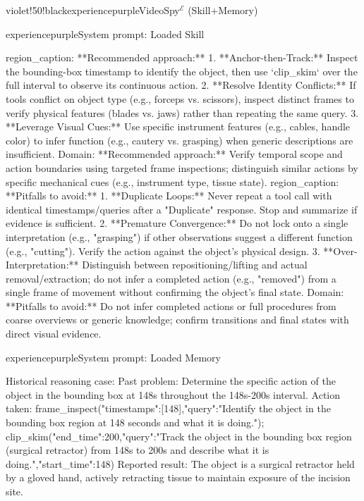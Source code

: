 \begin{ExecutionBox}[breakable,title after break={VideoSpy$^{\mathcal{E}}$ (Skill+Memory, continued)}]{violet!50!black}{experiencepurple}{VideoSpy$^{\mathcal{E}}$ (Skill+Memory)}
\raggedright
{}\par
\begin{MessageBox}{experiencepurple}{System prompt: Loaded Skill}
\begin{Trajectory}[highlightlines={3,11},highlightcolor=yellow!25]
region_caption:
**Recommended approach:**
1. **Anchor-then-Track:** Inspect the bounding-box timestamp to identify the object, then use `clip_skim` over the full interval to observe its continuous action.
2. **Resolve Identity Conflicts:** If tools conflict on object type (e.g., forceps vs. scissors), inspect distinct frames to verify physical features (blades vs. jaws) rather than repeating the same query.
3. **Leverage Visual Cues:** Use specific instrument features (e.g., cables, handle color) to infer function (e.g., cautery vs. grasping) when generic descriptions are insufficient.
Domain:
**Recommended approach:** Verify temporal scope and action boundaries using targeted frame inspections; distinguish similar actions by specific mechanical cues (e.g., instrument type, tissue state).
region_caption:
**Pitfalls to avoid:**
1. **Duplicate Loops:** Never repeat a tool call with identical timestamps/queries after a "Duplicate" response. Stop and summarize if evidence is sufficient.
2. **Premature Convergence:** Do not lock onto a single interpretation (e.g., "grasping") if other observations suggest a different function (e.g., "cutting"). Verify the action against the object's physical design.
3. **Over-Interpretation:** Distinguish between repositioning/lifting and actual removal/extraction; do not infer a completed action (e.g., "removed") from a single frame of movement without confirming the object's final state.
Domain:
**Pitfalls to avoid:** Do not infer completed actions or full procedures from coarse overviews or generic knowledge; confirm transitions and final states with direct visual evidence.
\end{Trajectory}
\end{MessageBox}
\begin{MessageBox}{experiencepurple}{System prompt: Loaded Memory}
\begin{Trajectory}
Historical reasoning case:
Past problem: Determine the specific action of the object in the bounding box at 148s throughout the 148s-200s interval.
Action taken: frame_inspect({"timestamps":[148],"query":"Identify the object in the bounding box region at 148 seconds and what it is doing."}); clip_skim({"end_time":200,"query":"Track the object in the bounding box region (surgical retractor) from 148s to 200s and describe what it is doing.","start_time":148})
Reported result: The object is a surgical retractor held by a gloved hand, actively retracting tissue to maintain exposure of the incision site.


\end{Trajectory}
\end{MessageBox}
\end{ExecutionBox}
